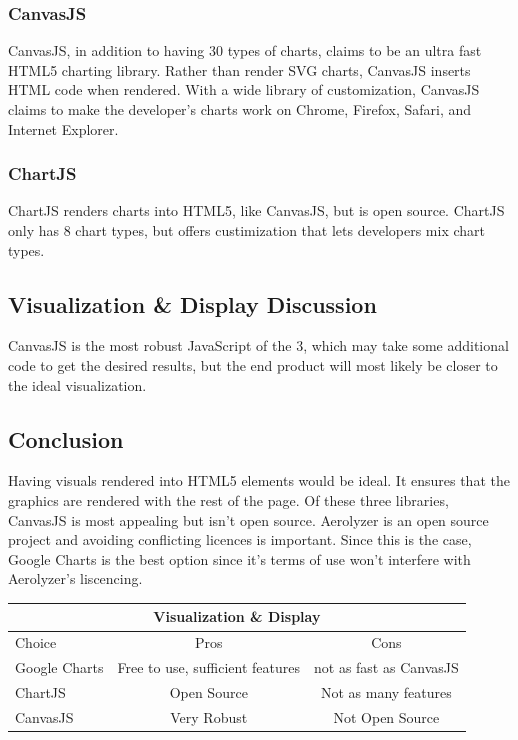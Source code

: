 \documentclass[onecolumn, draftclsnofoot,10pt, compsoc]{IEEEtran}
\begin{document}
\begin{singlespace}
\subsubsection{CanvasJS}
CanvasJS, in addition to having 30 types of charts, claims to be an ultra fast HTML5 charting library.
Rather than render SVG charts, CanvasJS inserts HTML code when rendered.
With a wide library of customization, CanvasJS claims to make the developer's charts work on Chrome, Firefox, Safari, and Internet Explorer.\cite{CanvasJS}
\subsubsection{ChartJS}
ChartJS renders charts into HTML5, like CanvasJS, but is open source.
ChartJS only has 8 chart types, but offers custimization that lets developers mix chart types.\cite{ChartJS}
\subsection{Visualization \& Display Discussion}
CanvasJS is the most robust JavaScript of the 3, which may take some additional code to get the desired results, but the end product will most likely be closer to the ideal visualization. \cite{CanvasJS}
\subsection{Conclusion}
Having visuals rendered into HTML5 elements would be ideal.
It ensures that the graphics are rendered with the rest of the page.
Of these three libraries, CanvasJS is most appealing but isn't open source.
Aerolyzer is an open source project and avoiding conflicting licences is important.
Since this is the case, Google Charts is the best option since it's terms of use won't interfere with Aerolyzer's liscencing.\cite{GoogleCh}\cite{CanvasJS}
\begin{center}
	\begin{tabular}{|l|c|c|} 
		\hline
		\multicolumn{3}{|c|}{Visualization \& Display} \\
		\hline
		Choice & Pros & Cons\\ [0.5ex] 
		\hline\hline
		Google Charts & Free to use, sufficient features & not as fast as CanvasJS \\ 
		\hline
		ChartJS & Open Source & Not as many features\\
		\hline
		CanvasJS & Very Robust & Not Open Source\\ [1ex] 
		\hline
	\end{tabular}
\end{center}


\end{singlespace}
\end{document}
